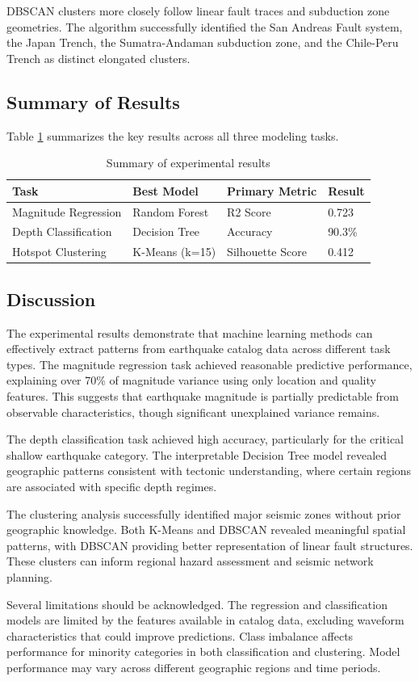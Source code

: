 DBSCAN clusters more closely follow linear fault traces and subduction zone geometries. The algorithm successfully identified the San Andreas Fault system, the Japan Trench, the Sumatra-Andaman subduction zone, and the Chile-Peru Trench as distinct elongated clusters.

\subsection{Summary of Results}

Table \ref{tab:summary_results} summarizes the key results across all three modeling tasks.

\begin{table}[H]
\centering
\caption{Summary of experimental results}
\label{tab:summary_results}
\begin{tabular}{|l|l|l|l|}
\hline
\textbf{Task} & \textbf{Best Model} & \textbf{Primary Metric} & \textbf{Result} \\
\hline
Magnitude Regression & Random Forest & R2 Score & 0.723 \\
Depth Classification & Decision Tree & Accuracy & 90.3\% \\
Hotspot Clustering & K-Means (k=15) & Silhouette Score & 0.412 \\
\hline
\end{tabular}
\end{table}

\subsection{Discussion}

The experimental results demonstrate that machine learning methods can effectively extract patterns from earthquake catalog data across different task types. The magnitude regression task achieved reasonable predictive performance, explaining over 70\% of magnitude variance using only location and quality features. This suggests that earthquake magnitude is partially predictable from observable characteristics, though significant unexplained variance remains.

The depth classification task achieved high accuracy, particularly for the critical shallow earthquake category. The interpretable Decision Tree model revealed geographic patterns consistent with tectonic understanding, where certain regions are associated with specific depth regimes.

The clustering analysis successfully identified major seismic zones without prior geographic knowledge. Both K-Means and DBSCAN revealed meaningful spatial patterns, with DBSCAN providing better representation of linear fault structures. These clusters can inform regional hazard assessment and seismic network planning.

Several limitations should be acknowledged. The regression and classification models are limited by the features available in catalog data, excluding waveform characteristics that could improve predictions. Class imbalance affects performance for minority categories in both classification and clustering. Model performance may vary across different geographic regions and time periods.
